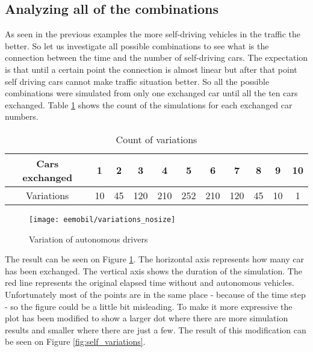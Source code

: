 		\subsection{Analyzing all of the combinations}
		As seen in the previous examples the more self-driving vehicles in the traffic the better. So let us investigate all possible combinations to see what is the connection between the time and the number of self-driving cars. The expectation is that until a certain point the connection is almost linear but after that point self driving cars cannot make traffic situation better.
		So all the possible combinations were simulated from only one exchanged car until all the ten cars exchanged. Table \ref{tab:all_variations} shows the count of the simulations for each exchanged car numbers.
		\begin{table}[ht]
			\begin{center}
				\begin{tabular}{ |c||c|c|c|c|c|c|c|c|c|c| }
					\hline
					Cars exchanged & 1   & 2    & 3    & 4     & 5      & 6     & 7     & 8   & 9   & 10\\
					\hline
					Variations            & 10 & 45 & 120 & 210 & 252 & 210 & 120 & 45 & 10 & 1\\
					\hline
				\end{tabular}
			\end{center}
			\caption{Count of variations}
			\label{tab:all_variations}
		\end{table}
		\begin{figure}
			\centering
			\texttt{[image: eemobil/variations\_nosize]}
			\caption{Variation of autonomous drivers}
			\label{fig:self_variations_nosize}
		\end{figure}

		The result can be seen on Figure \ref{fig:self_variations_nosize}. The horizontal axis represents how many car has been exchanged. The vertical axis shows the duration of the simulation. The red line represents the original elapsed time without and autonomous vehicles. Unfortunately most of the points are in the same place - because of the time step - so the figure could be a little bit misleading. To make it more expressive the plot has been modified to show a larger dot where there are more simulation results and smaller where there are just a few. The result of this modification can be seen on Figure \ref{fig:self_variations}.
		
